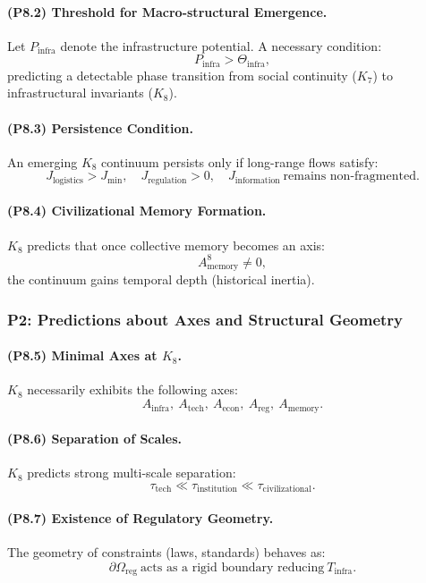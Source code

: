 \paragraph{(P8.2) Threshold for Macro-structural Emergence.}
Let $P_{\mathrm{infra}}$ denote the infrastructure potential.
A necessary condition:
\[
P_{\mathrm{infra}} > \Theta_{\mathrm{infra}},
\]
predicting a detectable phase transition from social continuity ($K_7$)
to infrastructural invariants ($K_8$).

\paragraph{(P8.3) Persistence Condition.}
An emerging $K_8$ continuum persists only if long-range flows satisfy:
\[
J_{\mathrm{logistics}} > J_{\mathrm{min}},
\quad
J_{\mathrm{regulation}} > 0,
\quad
J_{\mathrm{information}} \ \text{remains non-fragmented}.
\]

\paragraph{(P8.4) Civilizational Memory Formation.}
$K_8$ predicts that once collective memory becomes an axis:
\[
A_{\mathrm{memory}}^8 \neq 0,
\]
the continuum gains temporal depth (historical inertia).

\subsubsection{P2: Predictions about Axes and Structural Geometry}

\paragraph{(P8.5) Minimal Axes at \texorpdfstring{$K_8$}{K_8}.}
$K_8$ necessarily exhibits the following axes:
\[
A_{\mathrm{infra}},\
A_{\mathrm{tech}},\
A_{\mathrm{econ}},\
A_{\mathrm{reg}},\
A_{\mathrm{memory}}.
\]

\paragraph{(P8.6) Separation of Scales.}
$K_8$ predicts strong multi-scale separation:
\[
\tau_{\mathrm{tech}} \ll \tau_{\mathrm{institution}} \ll \tau_{\mathrm{civilizational}}.
\]

\paragraph{(P8.7) Existence of Regulatory Geometry.}
The geometry of constraints (laws, standards) behaves as:
\[
\partial\Omega_{\mathrm{reg}}
\ \text{acts as a rigid boundary reducing} \
T_{\mathrm{infra}}.
\]

